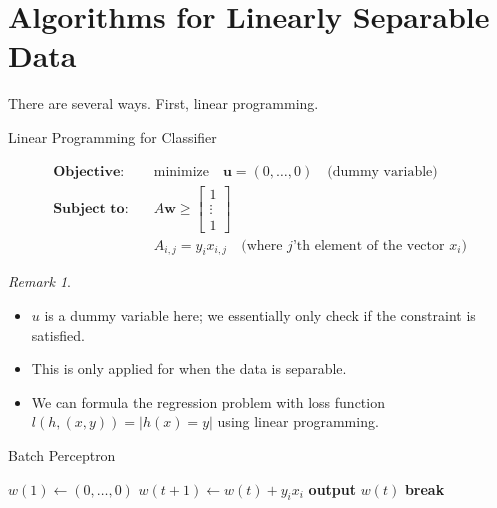 \documentclass{article}
\theoremstyle{remark}
\newtheorem{remark}[example]{Remark}
\begin{document}
\section*{Algorithms for Linearly Separable Data}
There are several ways. First, linear programming.
\begin{algorithm}[H]
        \caption{Linear Programming for Classifier}
        \begin{align*}
        \textbf{Objective:} \quad & \text{minimize} \quad \mathbf{u} = (0, \ldots, 0) \quad \text{(dummy variable)} \\
        \textbf{Subject to:} \quad & A\mathbf{w} \geq \begin{bmatrix} 1 \\ \vdots \\ 1 \end{bmatrix} \\
        & A_{i,j} = y_i x_{i,j} \quad \text{(where \(j\)'th element of the vector \(x_i\))}
\end{align*}
\end{algorithm}
\begin{remark}
\begin{itemize}
\item $u$ is a dummy variable here; we essentially only check if the constraint is satisfied.
\item This is only applied for when the data is separable.
\item We can formula the regression problem with loss function $l(h, (x,y))=\lvert h(x)=y\rvert$ using linear programming.
\end{itemize}
\end{remark}

\begin{algorithm}[H]
    \caption{Batch Perceptron}
    \begin{algorithmic}[1]
        \State $w(1) \gets (0, \ldots, 0)$
                \State $w(t+1) \gets w(t) + y_i x_i$
            \Else
                \State \textbf{output} $w(t)$
                \State \textbf{break}
            \EndIf
        \EndFor
    \EndFunction
    \end{algorithmic}
\end{algorithm}
\end{document}
